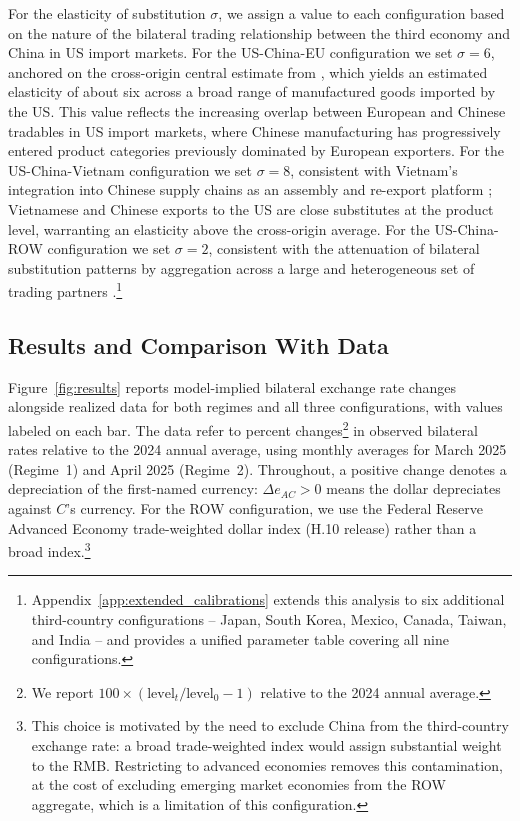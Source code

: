 \documentclass[11pt]{article}
\theoremstyle{plain}
\theoremstyle{remark}
\numberwithin{lemma}{section}
\numberwithin{proposition}{section}
\numberwithin{corollary}{section}
\newcommand{\rev}[1]{{\color{RevBlue}#1}}
\begin{document}
For the elasticity of substitution $\sigma$, we assign a value to each configuration based on the nature of the bilateral trading relationship between the third economy and China in US import markets. For the US-China-EU configuration we set $\sigma = 6$, anchored on the cross-origin central estimate from \citet{amiti2019impact}, which yields an estimated elasticity of about six across a broad range of manufactured goods imported by the US. This value reflects the increasing overlap between European and Chinese tradables in US import markets, where Chinese manufacturing has progressively entered product categories previously dominated by European exporters. For the US-China-Vietnam configuration we set $\sigma = 8$, consistent with Vietnam's integration into Chinese supply chains as an assembly and re-export platform \citep{fajgelbaum2024trade}; Vietnamese and Chinese exports to the US are close substitutes at the product level, warranting an elasticity above the cross-origin average. For the US-China-ROW configuration we set $\sigma = 2$, consistent with the attenuation of bilateral substitution patterns by aggregation across a large and heterogeneous set of trading partners \citep{fajgelbaum2020return, feenstra2018}.\footnote{Appendix~\ref{app:extended_calibrations} extends this analysis to six additional third-country configurations -- Japan, South Korea, Mexico, Canada, Taiwan, and India -- and provides a unified parameter table covering all nine configurations.}

\subsection{Results and Comparison With Data}

Figure~\ref{fig:results} reports model-implied bilateral exchange rate changes alongside realized data for both regimes and all three configurations, with values labeled on each bar. The data refer to percent changes\footnote{We report $100 \times (\text{level}_t / \text{level}_0 - 1)$ relative to the 2024 annual average.} in observed bilateral rates relative to the 2024 annual average, using monthly averages for March 2025 (Regime~1) and April 2025 (Regime~2). \rev{Throughout, a positive change denotes a depreciation of the first-named currency: $\Delta e_{AC} > 0$ means the dollar depreciates against $C$'s currency.} For the ROW configuration, we use the Federal Reserve Advanced Economy trade-weighted dollar index (H.10 release) rather than a broad index.\footnote{This choice is motivated by the need to exclude China from the third-country exchange rate: a broad trade-weighted index would assign substantial weight to the RMB. Restricting to advanced economies removes this contamination, at the cost of excluding emerging market economies from the ROW aggregate, which is a limitation of this configuration.}
\end{document}
